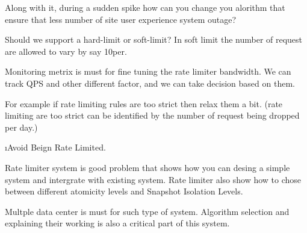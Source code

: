     Along with it, during a sudden spike how can you change you alorithm that ensure that less number of site user experience system outage?

    Should we support a hard-limit or soft-limit? In soft limit the number of request are allowed to vary by say 10per.

    Monitoring metrix is must for fine tuning the rate limiter bandwidth. We can track QPS and other different factor, and we can take decision based on them.

    For example if rate limiting rules are too strict then relax them a bit. (rate limiting are too strict can be identified by the number of request being dropped per day.)
    
\ls
    \i Avoid Beign Rate Limited.
\le



Rate limiter system is good problem that shows how you can desing a simple system and intergrate with existing system. Rate limiter also show how to chose between different atomicity levels and Snapshot Isolation Levels.

Multple data center is must for such type of system. Algorithm selection and explaining their working is also a critical part of this system.

